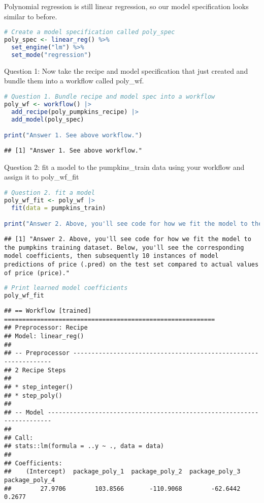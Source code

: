 \documentclass[
]{article}
\begin{document}
Polynomial regression is still linear regression, so our model
specification looks similar to before.

\begin{lstlisting}[language=R]
# Create a model specification called poly_spec
poly_spec <- linear_reg() %>% 
  set_engine("lm") %>% 
  set_mode("regression")
\end{lstlisting}

Question 1: Now take the recipe and model specification that just
created and bundle them into a workflow called poly\_wf.

\begin{lstlisting}[language=R]
# Question 1. Bundle recipe and model spec into a workflow
poly_wf <- workflow() |> 
  add_recipe(poly_pumpkins_recipe) |> 
  add_model(poly_spec)

print("Answer 1. See above workflow.")
\end{lstlisting}

\begin{lstlisting}
## [1] "Answer 1. See above workflow."
\end{lstlisting}

Question 2: fit a model to the pumpkins\_train data using your workflow
and assign it to poly\_wf\_fit

\begin{lstlisting}[language=R]
# Question 2. fit a model
poly_wf_fit <- poly_wf |> 
  fit(data = pumpkins_train)

print("Answer 2. Above, you'll see code for how we fit the model to the pumpkins training dataset. Below, you'll see the corresponding model coefficients, then subsequently 10 instances of model predictions of price (.pred) on the test set compared to actual values of price (price).")
\end{lstlisting}

\begin{lstlisting}
## [1] "Answer 2. Above, you'll see code for how we fit the model to the pumpkins training dataset. Below, you'll see the corresponding model coefficients, then subsequently 10 instances of model predictions of price (.pred) on the test set compared to actual values of price (price)."
\end{lstlisting}

\begin{lstlisting}[language=R]
# Print learned model coefficients
poly_wf_fit
\end{lstlisting}

\begin{lstlisting}
## == Workflow [trained] ==========================================================
## Preprocessor: Recipe
## Model: linear_reg()
## 
## -- Preprocessor ----------------------------------------------------------------
## 2 Recipe Steps
## 
## * step_integer()
## * step_poly()
## 
## -- Model -----------------------------------------------------------------------
## 
## Call:
## stats::lm(formula = ..y ~ ., data = data)
## 
## Coefficients:
##    (Intercept)  package_poly_1  package_poly_2  package_poly_3  package_poly_4  
##        27.9706        103.8566       -110.9068        -62.6442          0.2677
\end{lstlisting}
\end{document}
